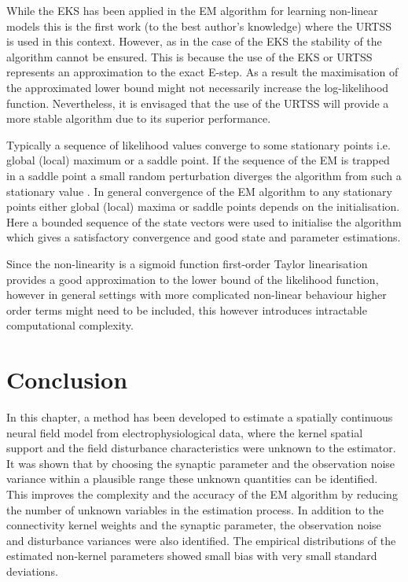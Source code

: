 \documentclass[]{article}
\begin{document}
While the EKS has been  applied in the EM algorithm for learning non-linear models \cite{Ghahramani1999} this is the first work (to the best author's knowledge) where the URTSS is used in this context. However, as in the case of the EKS the stability of the algorithm cannot be ensured. This is because the use of the EKS or URTSS represents an approximation to the exact E-step. As a result the maximisation of the approximated lower bound might not necessarily increase the log-likelihood function. Nevertheless, it is envisaged that the use of the URTSS will provide a more stable algorithm due to its superior performance.

Typically a sequence of likelihood values converge to some stationary points i.e. global (local) maximum or a saddle point. If the sequence of the EM is trapped in a saddle point a small random perturbation diverges the algorithm from such a stationary value \cite{McLachlan1997}. In general convergence of the EM algorithm to any stationary points either global (local) maxima or saddle points depends on the initialisation. Here a bounded sequence of the state vectors were used to initialise the algorithm which gives a satisfactory convergence and good state and parameter estimations.

Since the non-linearity is a sigmoid function first-order Taylor linearisation provides a good approximation to the lower bound of the likelihood function, however in general settings with more complicated non-linear behaviour higher order terms might need to be included, this however introduces intractable computational complexity.
\section{Conclusion}
In this chapter, a method has been developed to estimate a spatially continuous neural field model from electrophysiological data, where the kernel spatial support and the field disturbance characteristics were unknown to the estimator.  It was shown that by choosing the synaptic parameter and the observation noise variance within a plausible range these unknown quantities can be identified. This improves the complexity and the accuracy of the EM algorithm by reducing the number of unknown variables in the estimation process. In addition to the connectivity kernel weights and the synaptic parameter, the observation noise and disturbance variances were also identified. The empirical distributions of the estimated non-kernel parameters showed small bias with very small standard deviations.
\end{document}
